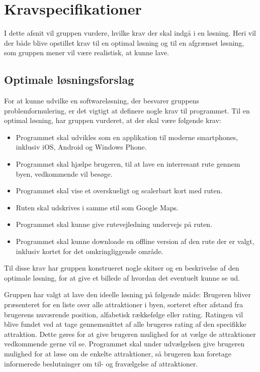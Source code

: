 
\chapter{Kravspecifikationer}
I dette afsnit vil gruppen vurdere, hvilke krav der skal indgå i en løsning. Heri vil der både blive opstillet krav til en optimal løsning og til en afgrænset løsning, som gruppen mener vil være realistisk, at kunne lave.

\section{Optimale løsningsforslag}
For at kunne udvilke en softwareløsning, der besvarer gruppens problemformulering, er det vigtigt at definere nogle krav til programmet. Til en optimal løsning, har gruppen vurderet, at der skal være følgende krav:
\begin{itemize}
	\item Programmet skal udvikles som en applikation til moderne smartphones, inklusiv iOS, Android og Windows Phone.
	\item Programmet skal hjælpe brugeren, til at lave en interresant rute gennem byen, vedkommende vil besøge.
	\item Programmet skal vise et overskueligt og scalerbart kort med ruten.
	\item Ruten skal udskrives i samme stil som Google Maps.
	\item Programmet skal kunne give rutevejledning undervejs på ruten. 
	\item Programmet skal kunne  downloade en offline version af den rute der er valgt, inklusiv kortet for det omkringliggende område.
\end{itemize}
Til disse krav har gruppen konstrueret nogle skitser og en beskrivelse af den optimale løsning, for at give et billede af hvordan det eventuelt kunne se ud.

Gruppen har valgt at lave den ideelle løsning på følgende måde:\newline
Brugeren bliver præsenteret for en liste over alle attraktioner i byen, sorteret efter afstand fra brugerens nuværende position, alfabetisk rækkefølge eller rating. \newline
Ratingen vil blive fundet ved at tage gennemsnittet af alle brugeres rating af den specifikke attraktion. Dette gøres for at give brugeren mulighed for at vælge de attraktioner vedkommende gerne vil se.
\newline
Programmet skal under udvælgelsen give brugeren mulighed for at læse om de enkelte attraktioner, så brugeren kan foretage informerede beslutninger om til- og fravælgelse af attraktioner.

